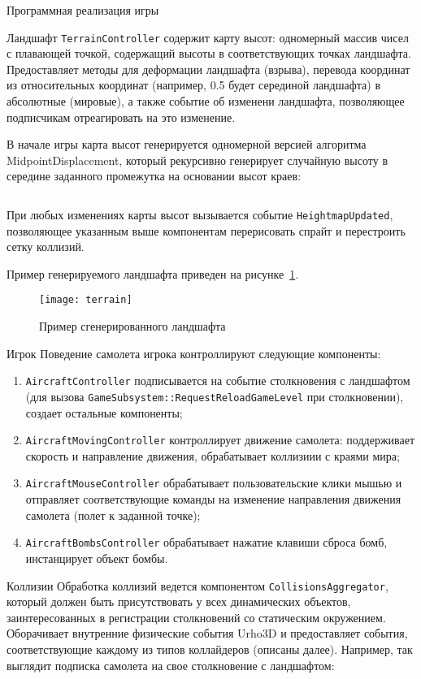 \begin{section}{Программная реализация игры}
\begin{subsection}{Ландшафт}
			\verb|TerrainController| содержит карту высот: одномерный массив чисел с плавающей точкой, содержащий высоты в соответствующих точках ландшафта.
			Предоставляет методы для деформации ландшафта (взрыва), перевода координат из относительных координат (например, 0.5 будет серединой ландшафта) в абсолютные (мировые), а также событие об изменени ландшафта, позволяющее подписчикам отреагировать на это изменение.

			В начале игры карта высот генерируется одномерной версией алгоритма MidpointDisplacement, который рекурсивно генерирует случайную высоту в середине заданного промежутка на основании высот краев:
			\inputminted{cpp}{listings/MidpointDisplacement1D.cpp}

			При любых изменениях карты высот вызывается событие \verb|HeightmapUpdated|, позволяющее указанным выше компонентам перерисовать спрайт и перестроить сетку коллизий.

			Пример генерируемого ландшафта приведен на рисунке~\ref{terrain}.

			\begin{figure}[h]
				\texttt{[image: terrain]}
				\caption{Пример сгенерированного ландшафта}
				\label{terrain}
			\end{figure}
		\end{subsection}

		\begin{subsection}{Игрок}
			Поведение самолета игрока контроллируют следующие компоненты:
			\begin{enumerate}
				\item \verb|AircraftController| подписывается на событие столкновения с ландшафтом (для вызова \verb|GameSubsystem::RequestReloadGameLevel| при столкновении), создает остальные компоненты;
				\item \verb|AircraftMovingController| контроллирует движение самолета: поддерживает скорость и направление движения, обрабатывает коллизиии с краями мира;
				\item \verb|AircraftMouseController| обрабатывает пользовательские клики мышью и отправляет соответствующие команды на изменение направления движения самолета (полет к заданной точке);
				\item \verb|AircraftBombsController| обрабатывает нажатие клавиши сброса бомб, инстанцирует объект бомбы.
			\end{enumerate}
		\end{subsection}

		\begin{subsection}{Коллизии}
			Обработка коллизий ведется компонентом \verb|CollisionsAggregator|, который должен быть присутствовать у всех динамических объектов, заинтересованных в регистрации столкновений со статическим окружением.
			Оборачивает внутренние физические события Urho3D и предоставляет события, соответствующие каждому из типов коллайдеров (описаны далее).
			Например, так выглядит подписка самолета на свое столкновение с ландшафтом:


\end{subsection}
\end{section}
